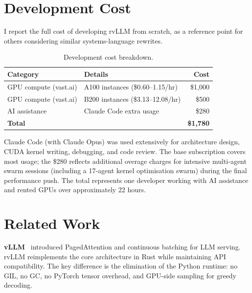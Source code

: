\documentclass[11pt,a4paper]{article}
\newcommand{\thead}[1]{\textbf{#1}}
\begin{document}
\section{Development Cost}
\label{sec:cost}

I report the full cost of developing rvLLM from scratch, as a reference point
for others considering similar systems-language rewrites.

\begin{table}[h]
  \centering
  \caption{Development cost breakdown.}
  \label{tab:cost}
  \small
  \begin{tabular}{@{}llr@{}}
    \toprule
    \rowcolor{HeaderBlue} \thead{Category} & \thead{Details} & \thead{Cost} \\
    \midrule
    GPU compute (vast.ai) & A100 instances (\$0.60--1.15/hr) & \$1{,}000 \\
    \rowcolor{gray!8}
    GPU compute (vast.ai) & B200 instances (\$3.13--12.08/hr) & \$500 \\
    AI assistance         & Claude Code extra usage & \$280 \\
    \midrule
    \rowcolor{gray!8}
    \textbf{Total}        &                         & \textbf{\$1{,}780} \\
    \bottomrule
  \end{tabular}
\end{table}

Claude Code (with Claude Opus) was used extensively for architecture design, CUDA
kernel writing, debugging, and code review. The base subscription covers most usage;
the \$280 reflects additional overage charges for intensive multi-agent swarm sessions
(including a 17-agent kernel optimisation swarm) during the final performance push.
The total represents one developer working with AI assistance and rented GPUs over
approximately 22 hours.

\section{Related Work}
\label{sec:related}

\textbf{vLLM}~\cite{kwon2023vllm} introduced PagedAttention and continuous batching
for LLM serving. rvLLM reimplements the core architecture in Rust while maintaining
API compatibility. The key difference is the elimination of the Python runtime:
no GIL, no GC, no PyTorch tensor overhead, and GPU-side sampling for greedy decoding.
\end{document}
